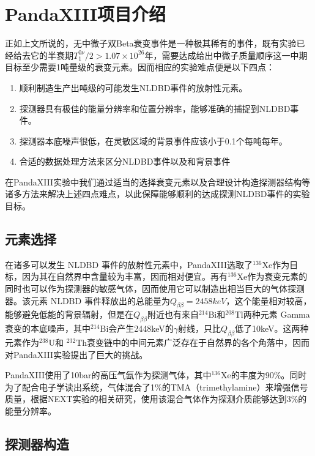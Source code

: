 \chapter{PandaXIII项目介绍}
\label{chapter:intro}

正如上文所说的，无中微子双Beta衰变事件是一种极其稀有的事件，既有实验已经给去它的半衰期$T^{0\nu}_1/2>1.07\times10^{26}$年，需要达成给出中微子质量顺序这一中期目标至少需要1吨量级的衰变元素。因而相应的实验难点便是以下四点：
\begin{enumerate}
    \item 顺利制造生产出吨级的可能发生NLDBD事件的放射性元素。
    \item 探测器具有极佳的能量分辨率和位置分辨率，能够准确的捕捉到NLDBD事件。
    \item 探测器本底噪声很低，在灵敏区域的背景事件应该小于0.1个每吨每年。
    \item 合适的数据处理方法来区分NLDBD事件以及和背景事件
\end{enumerate}
在PandaXIII实验中我们通过适当的选择衰变元素以及合理设计构造探测器结构等诸多方法来解决上述四点难点，以此保障能够顺利的达成探测NLDBD事件的实验目标。

\section{元素选择}

在诸多可以发生 NLDBD 事件的放射性元素中，PandaXIII选取了$^{136}$Xe作为目标，因为其在自然界中含量较为丰富，因而相对便宜。再有$^{136}$Xe作为衰变元素的同时也可以作为探测器的敏感气体，因而使用它可以制造出相当巨大的气体探测器。该元素 NLDBD 事件释放出的总能量为$Q_{\beta\beta}=2458keV$，这个能量相对较高，能够避免低能的背景辐射，但是在$Q_{\beta\beta}$附近也有来自$^{214}$Bi和$^{208}$Tl两种元素 Gamma 衰变的本底噪声，其中$^{214}$Bi会产生2448keV的$\gamma$射线，只比$Q_{\beta\beta}$低了10keV。这两种元素作为$^{238}$U和
$^{232}$Th衰变链中的中间元素广泛存在于自然界的各个角落中，因而对PandaXIII实验提出了巨大的挑战。

PandaXIII使用了10bar的高压气氙作为探测气体，其中$^{136}$Xe的丰度为90\%。同时为了配合电子学读出系统，气体混合了1\%的TMA（trimethylamine）来增强信号质量，根据NEXT实验的相关研究，使用该混合气体作为探测介质能够达到3\%的能量分辨率\supercite{azevedoh2015accurate}。

\section{探测器构造}

